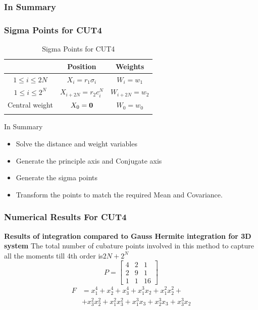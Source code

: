 \documentclass{beamer}
\begin{document}
\begin{frame}
\frametitle{In Summary}
\frametitle{Sigma Points for CUT4 }
\begin{table}
\caption{Sigma Points for CUT4 }
\normalsize
\label{sigpointscut4}
\begin{center}
\begin{tabular}{c|c|c}
&Position & Weights\\
\hline
\hline
$1\le i\le 2N$ & $X_i=r_1\sigma_i$ & $W_i=w_1$\\
\hline\noalign{\smallskip}
$1 \le i \le 2^N$ & $X_{i+2N}=r_2c^N_i$ & $W_{i+2N}=w_2$\\
\hline\noalign{\smallskip}
Central weight & $X_{0}={\bf 0}$ & $W_{0}=w_0$\\
\hline\noalign{\smallskip}
\multicolumn{3}{c}{$n=2N+2^N$$\:(+1)$} \\
\hline
\end{tabular}
\end{center}
\end{table}
\begin{block}{In Summary}
\begin{itemize}[<+->]
\item Solve the distance and weight variables
\item Generate the principle axis and Conjugate axis
\item Generate the sigma points
\item Transform the points to match the required Mean and Covariance.
\end{itemize}
\end{block}
\end{frame}
\begin{frame}
\frametitle{Numerical Results For CUT4}
{\bf Results of integration compared to Gauss Hermite integration for 3D system}\newline
The total number of cubature points involved in this method to capture all the moments till 4th order is{\bf  $2N+2^N$}
\[
 P = \begin{bmatrix}
       4 & 2 & 1    \\
       2 & 9 & 1     \\
       1 & 1 & 16
     \end{bmatrix}
\]
\begin{align*}
F&=x_1^4+x_2^4+x_3^4+x_1^3x_2+x_1^2x_2^2+\\
 &+x_3^2x_2^2+x_1^2x_3^2+x_1^3x_3+x_2^3x_3+x_3^3x_2
\end{align*}
\end{frame}
\end{document}

